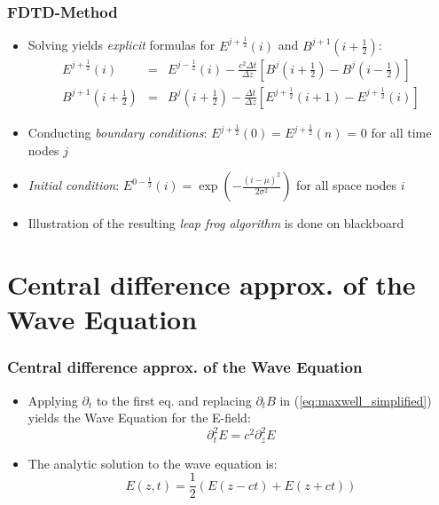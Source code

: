 \documentclass[ignorenonframetext]{beamer}
\begin{document}
\begin{frame}
\frametitle{FDTD-Method}
\begin{itemize}
\item Solving yields \emph{explicit} formulas for $E^{j+\frac{1}{2}}(i)$ and $B^{j+1}(i+\frac{1}{2})$:
\begin{eqnarray}
E^{j+\frac{1}{2}}(i)&=& E^{j-\frac{1}{2}}(i) -  \frac{c^2 \Delta t}{\Delta z} \left[B^j(i+\frac{1}{2}) - B^j(i-\frac{1}{2})\right] \nonumber\\
B^{j+1}(i+\frac{1}{2}) &=& B^{j}(i+\frac{1}{2}) - \frac{\Delta t}{\Delta z}\left[E^{j+\frac{1}{2}}(i+1) - E^{j+\frac{1}{2}}(i)\right]
\end{eqnarray}
\item Conducting \emph{boundary conditions}: $E^{j+\frac{1}{2}}(0) = E^{j+\frac{1}{2}}(n)$ = 0 for all time nodes $j$
\item \emph{Initial condition}: $E^{0-\frac{1}{2}}(i) = \exp\left(-\frac{(i - \mu)^2}{2 \sigma^2}\right)$ for all space nodes $i$
\item Illustration of the resulting \emph{leap frog algorithm} is done on blackboard 
\end{itemize}
\end{frame}


\section{Central difference approx. of the Wave Equation}
\begin{frame}
\frametitle{Central difference approx. of the Wave Equation}
\begin{itemize}
\item Applying $\partial_t$ to the first eq. and replacing $\partial_t B$ in (\ref{eq:maxwell_simplified}) yields the Wave Equation for the E-field:
\begin{equation}
\partial^2_t E = c^2 \partial^2_z E
\end{equation}
\item The analytic solution to the wave equation is:
\begin{equation}
E(z, t) = \frac{1}{2}\left(E(z-ct)+E(z+ct)\right)
\end{equation}
\end{itemize}
\end{frame}
\end{document}
